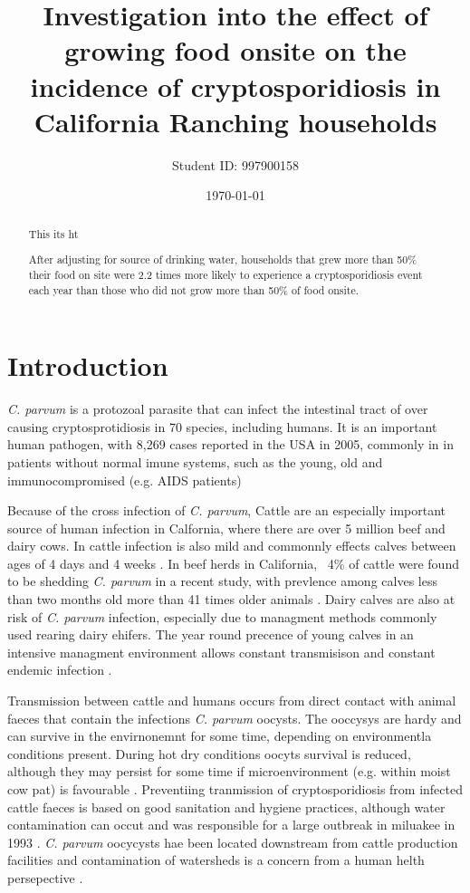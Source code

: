 \documentclass[12pt]{article}
\title{Investigation into the effect of growing food onsite on the incidence of cryptosporidiosis in California Ranching households}
\author{Student ID: 997900158}
\date{\today}
\begin{document}
	\maketitle
	\begin{abstract}
		This its ht 

		After adjusting for source of drinking water, households that grew more than 50\% their food  on site were 2.2 times more likely to experience a cryptosporidiosis event each year than those who did not grow more than 50\% of food onsite.

	\end{abstract}

\doublespacing
	\section{Introduction} 
	\emph{C. parvum} is a protozoal parasite that can infect the intestinal tract of over causing cryptosprotidiosis in  70 species, \cite{Casemore1997} including humans.
	It is an important human pathogen, with 8,269 cases reported in the USA in 2005, commonly in in patients without normal imune systems, such as the young, old and immunocompromised (e.g. AIDS patients) \cite{Yoder2007}


	Because of the cross infection of \emph{C. parvum}, Cattle are an especially important source of human infection in Calfornia, where there are over 5 million beef and dairy cows. \cite{WesternFarm}
	In cattle infection is also mild and commonnly effects calves between ages of 4 days and 4 weeks \cite{malmo2010}. 
	In beef herds in California, ~4\% of cattle were found to be shedding \emph{C. parvum} in a recent study, with prevlence among calves less than two months old more than 41 times older animals \cite{Atwill1999a}.
	Dairy calves are also at risk of \emph{C. parvum} infection, especially due to managment methods commonly used rearing dairy ehifers. The year round precence of young calves in an intensive managment environment allows constant transmisison and constant endemic infection .\cite{Atwill1998}
	
	
	Transmission between cattle and humans occurs from direct contact with animal faeces that contain the infections \emph{C. parvum} oocysts\cite{malmo2010}.
	The ooccysys are hardy and can survive in the envirnonemnt for some time, depending on environmentla conditions present. 
	During hot dry conditions oocyts survival is reduced, although they may persist for some time if microenvironment (e.g. within moist cow pat) is favourable \cite{Robertson1992}.
	Preventiing tranmission of cryptosporidiosis from infected cattle faeces is based on good sanitation and hygiene practices\cite{malmo2010}, although water contamination can occut and was responsible for a large outbreak in miluakee in 1993 \cite{Kenzie1994}. 
	\emph{C. parvum} oocycysts hae been located downstream from cattle production facilities and contamination of watersheds is a concern from a human helth persepective \cite{Ong1996}. 
\end{document}
